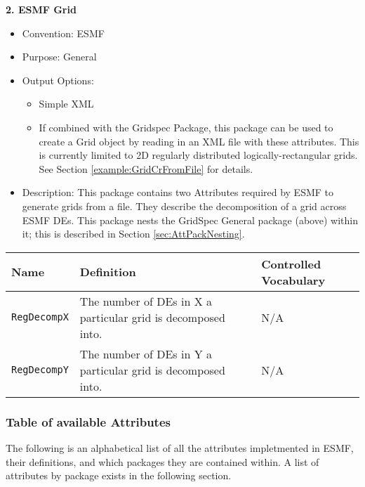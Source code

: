 \vspace{.20in}
{\bf 2. ESMF Grid}

\label{ESMFGridAttributePackage}

\begin{itemize}
    \item Convention: ESMF
    \item Purpose: General
    \item Output Options:
    \begin{itemize}
        \item Simple XML
        \item If combined with the Gridspec Package, this package can be used to create a Grid object by reading in an XML file with these attributes. This is currently limited to 2D regularly distributed logically-rectangular grids. See Section \ref{example:GridCrFromFile} for details. 
    \end{itemize}
    \item Description: This package contains two Attributes required by ESMF to generate grids from a file. They describe the decomposition of a grid across ESMF DEs.  This package nests the GridSpec General package (above) within it; this is described in Section \ref{sec:AttPackNesting}.
\end{itemize}


\begin{tabular}{|p{6cm}|p{10cm}|p{10cm}|}
{\bf Name} & {\bf Definition} & {\bf Controlled Vocabulary} \\
\hline\hline
{\tt RegDecompX} & The number of DEs in X a particular grid is decomposed into.& N/A\\
{\tt RegDecompY} & The number of DEs in Y a particular grid is decomposed into.& N/A\\
\end{tabular}



\vspace{.20in}
\subsubsection{Table of available Attributes}

The following is an alphabetical list of all the attributes impletmented in ESMF, their definitions, and which packages they are contained within. A list of attributes by package exists in the following section. 


